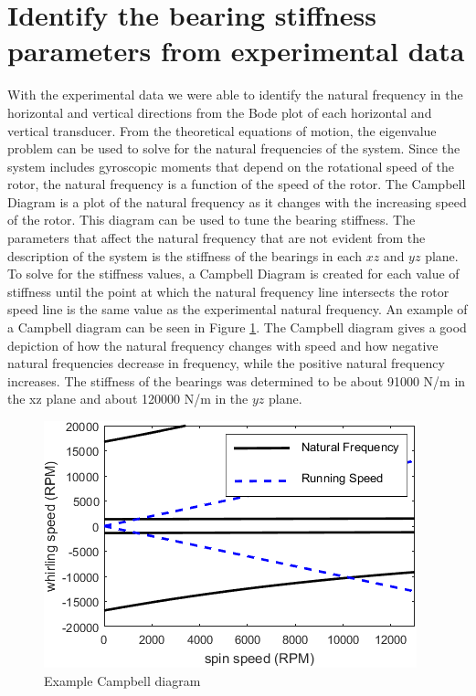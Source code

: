 	\section{Identify the bearing stiffness parameters from experimental data}
		With the experimental data we were able to identify the natural frequency in the horizontal and vertical directions from the Bode plot of each horizontal and vertical transducer. From the theoretical equations of motion, the eigenvalue problem can be used to solve for the natural frequencies of the system. Since the system includes gyroscopic moments that depend on the rotational speed of the rotor, the natural frequency is a function of the speed of the rotor. The Campbell Diagram is a plot of the natural frequency as it changes with the increasing speed of the rotor. This diagram can be used to tune the bearing stiffness. The parameters that affect the natural frequency that are not evident from the description of the system is the stiffness of the bearings in each $xz$ and $yz$ plane. To solve for the stiffness values, a Campbell Diagram is created for each value of stiffness until the point at which the natural frequency line intersects the rotor speed line is the same value as the experimental natural frequency. An example of a Campbell diagram can be seen in Figure \ref{fig:Figure_4}. The Campbell diagram gives a good depiction of how the natural frequency changes with speed and how negative natural frequencies decrease in frequency, while the positive natural frequency increases. The stiffness of the bearings was determined to be about 91000 N/m in the xz plane and about 120000 N/m in the $yz$ plane.\par 
		\begin{figure}[H]
			\centering
			\includegraphics[scale=.75]{./figures/Images/Figure_4}
			\caption{Example Campbell diagram}
			\label{fig:Figure_4}
		\end{figure}
